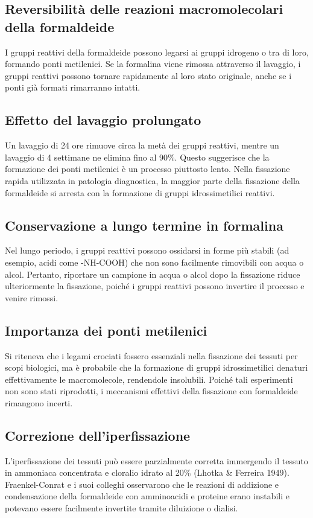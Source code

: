 \subsection{Reversibilità delle reazioni macromolecolari della formaldeide}
I gruppi reattivi della formaldeide possono legarsi ai gruppi idrogeno o tra di loro, formando ponti metilenici. Se la formalina viene rimossa attraverso il lavaggio, i gruppi reattivi possono tornare rapidamente al loro stato originale, anche se i ponti già formati rimarranno intatti.

\subsection{Effetto del lavaggio prolungato}
Un lavaggio di 24 ore rimuove circa la metà dei gruppi reattivi, mentre un lavaggio di 4 settimane ne elimina fino al 90\%. Questo suggerisce che la formazione dei ponti metilenici è un processo piuttosto lento. Nella fissazione rapida utilizzata in patologia diagnostica, la maggior parte della fissazione della formaldeide si arresta con la formazione di gruppi idrossimetilici reattivi.

\subsection{Conservazione a lungo termine in formalina}
Nel lungo periodo, i gruppi reattivi possono ossidarsi in forme più stabili (ad esempio, acidi come -NH-COOH) che non sono facilmente rimovibili con acqua o alcol. Pertanto, riportare un campione in acqua o alcol dopo la fissazione riduce ulteriormente la fissazione, poiché i gruppi reattivi possono invertire il processo e venire rimossi.

\subsection{Importanza dei ponti metilenici}
Si riteneva che i legami crociati fossero essenziali nella fissazione dei tessuti per scopi biologici, ma è probabile che la formazione di gruppi idrossimetilici denaturi effettivamente le macromolecole, rendendole insolubili. Poiché tali esperimenti non sono stati riprodotti, i meccanismi effettivi della fissazione con formaldeide rimangono incerti.

\subsection{Correzione dell'iperfissazione}
L'iperfissazione dei tessuti può essere parzialmente corretta immergendo il tessuto in ammoniaca concentrata e cloralio idrato al 20\% (Lhotka \& Ferreira 1949). Fraenkel-Conrat e i suoi colleghi osservarono che le reazioni di addizione e condensazione della formaldeide con amminoacidi e proteine erano instabili e potevano essere facilmente invertite tramite diluizione o dialisi.


